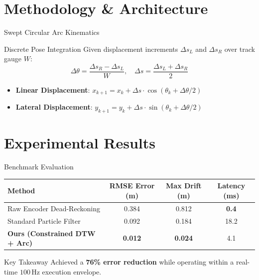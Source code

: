 \documentclass[aspectratio=169,10pt]{beamer}
\begin{document}
\section{Methodology \& Architecture}
\begin{frame}{Swept Circular Arc Kinematics}
    \begin{block}{Discrete Pose Integration}
        Given displacement increments $\Delta s_L$ and $\Delta s_R$ over track gauge $W$:
        \begin{equation}
        \Delta \theta = \frac{\Delta s_R - \Delta s_L}{W}, \quad \Delta s = \frac{\Delta s_L + \Delta s_R}{2}
        \end{equation}
    \end{block}

    \begin{itemize}
        \item \textbf{Linear Displacement}: $x_{k+1} = x_k + \Delta s \cdot \cos(\theta_k + \Delta\theta / 2)$
        \item \textbf{Lateral Displacement}: $y_{k+1} = y_k + \Delta s \cdot \sin(\theta_k + \Delta\theta / 2)$
    \end{itemize}
\end{frame}

\section{Experimental Results}
\begin{frame}{Benchmark Evaluation}
    \begin{center}
    \begin{tabular}{lccc}
        \toprule
        \textbf{Method} & \textbf{RMSE Error (m)} & \textbf{Max Drift (m)} & \textbf{Latency (ms)} \\
        \midrule
        Raw Encoder Dead-Reckoning & 0.384 & 0.812 & \textbf{0.4} \\
        Standard Particle Filter   & 0.092 & 0.184 & 18.2 \\
        \textbf{Ours (Constrained DTW + Arc)} & \textbf{0.012} & \textbf{0.024} & 4.1 \\
        \bottomrule
    \end{tabular}
    \end{center}

    \begin{alertblock}{Key Takeaway}
        Achieved a \textbf{76\% error reduction} while operating within a real-time $100\,\text{Hz}$ execution envelope.
    \end{alertblock}
\end{frame}
\end{document}
